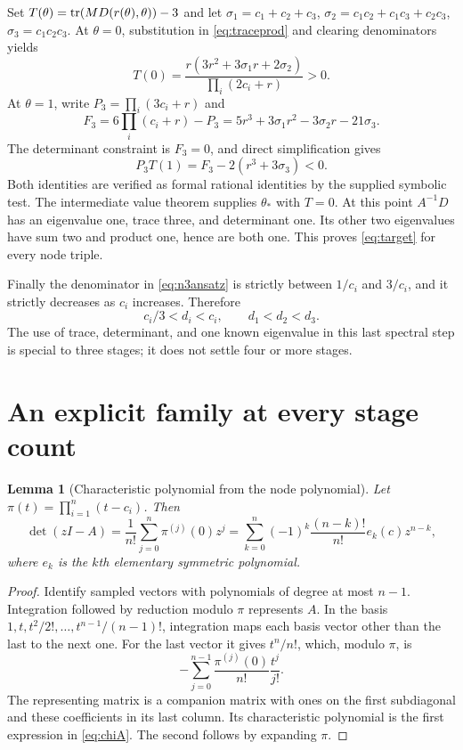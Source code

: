 \documentclass[11pt]{article}
\newtheorem{lemma}[theorem]{Lemma}
\theoremstyle{remark}\newtheorem{remark}[theorem]{Remark}
\begin{document}
Set $T(\theta)=\operatorname{tr}(MD(r(\theta),\theta))-3$ and let
$\sigma_1=c_1+c_2+c_3$, $\sigma_2=c_1c_2+c_1c_3+c_2c_3$,
$\sigma_3=c_1c_2c_3$. At $\theta=0$, substitution in
\eqref{eq:traceprod} and clearing denominators yields
\begin{equation}\label{eq:end0}
 T(0)=\frac{r(3r^2+3\sigma_1r+2\sigma_2)}{\prod_i(2c_i+r)}>0.
\end{equation}
At $\theta=1$, write $P_3=\prod_i(3c_i+r)$ and
\[
 F_3=6\prod_i(c_i+r)-P_3
    =5r^3+3\sigma_1r^2-3\sigma_2r-21\sigma_3.
\]
The determinant constraint is $F_3=0$, and direct simplification gives
\begin{equation}\label{eq:end1}
 P_3T(1)=F_3-2(r^3+3\sigma_3)<0.
\end{equation}
Both identities are verified as formal rational identities by the supplied
symbolic test. The intermediate value theorem supplies $\theta_*$ with $T=0$.
At this point $A^{-1}D$ has an eigenvalue one, trace three, and determinant
one. Its other two eigenvalues have sum two and product one, hence are both
one. This proves \eqref{eq:target} for every node triple.

Finally the denominator in \eqref{eq:n3ansatz} is strictly between $1/c_i$
and $3/c_i$, and it strictly decreases as $c_i$ increases. Therefore
\[
 c_i/3<d_i<c_i,\qquad d_1<d_2<d_3.
\]
The use of trace, determinant, and one known eigenvalue in this last spectral
step is special to three stages; it does not settle four or more stages.

\section{An explicit family at every stage count}\label{sec:laguerre}
\begin{lemma}[Characteristic polynomial from the node polynomial]\label{lem:chi}
Let $\pi(t)=\prod_{i=1}^n(t-c_i)$. Then
\begin{equation}\label{eq:chiA}
 \det(zI-A)=\frac1{n!}\sum_{j=0}^n\pi^{(j)}(0)z^j
 =\sum_{k=0}^n(-1)^k\frac{(n-k)!}{n!}e_k(c)z^{n-k},
\end{equation}
where $e_k$ is the $k$th elementary symmetric polynomial.
\end{lemma}
\begin{proof}
Identify sampled vectors with polynomials of degree at most $n-1$.
Integration followed by reduction modulo $\pi$ represents $A$. In the basis
$1,t,t^2/2!,\ldots,t^{n-1}/(n-1)!$, integration maps each basis vector other
than the last to the next one. For the last vector it gives $t^n/n!$, which,
modulo $\pi$, is
\[
 -\sum_{j=0}^{n-1}\frac{\pi^{(j)}(0)}{n!}\frac{t^j}{j!}.
\]
The representing matrix is a companion matrix with ones on the first
subdiagonal and these coefficients in its last column. Its characteristic
polynomial is the first expression in \eqref{eq:chiA}. The second follows by
expanding $\pi$.
\end{proof}
\end{document}
